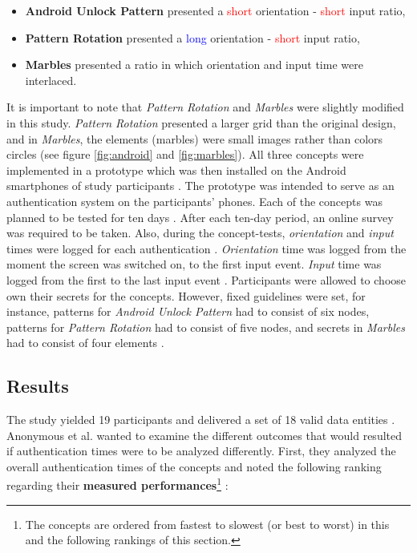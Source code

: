 \begin{itemize}
    \item \textbf{Android Unlock Pattern} presented a \textcolor{red}{short} orientation - \textcolor{red}{short} input ratio,
    \item \textbf{Pattern Rotation} presented a \textcolor{blue}{long} orientation - \textcolor{red}{short} input ratio,
    \item \textbf{Marbles} presented a ratio in which orientation and input time were interlaced.
\end{itemize}

It is important to note that \textit{Pattern Rotation} and \textit{Marbles} \cite{Marbles} were slightly modified in this study. \textit{Pattern Rotation} presented a larger grid than the original design, and in \textit{Marbles}, the elements (marbles) were small images rather than colors circles (see figure \ref{fig:android} and \ref{fig:marbles}). All three concepts were implemented in a prototype which was then installed on the Android smartphones of study participants \cite{anonymous}. The prototype was intended to serve as an authentication system on the participants' phones. Each of the concepts was planned to be tested for ten days \cite{anonymous}. After each ten-day period, an online survey was required to be taken. Also, during the concept-tests, \textit{orientation} and \textit{input} times were logged for each authentication \cite{anonymous}. \textit{Orientation} time was logged from the moment the screen was switched on, to the first input event. \textit{Input} time was logged from the first to the last input event \cite{anonymous}. Participants were allowed to choose own their secrets for the concepts. However, fixed guidelines were set, for instance, patterns for \textit{Android Unlock Pattern} had to consist of six nodes, patterns for \textit{Pattern Rotation} had to consist of five nodes, and secrets in \textit{Marbles} had to consist of four elements \cite{anonymous}.

\subsection{Results}

The study yielded 19 participants and delivered a set of 18 valid data entities \cite{anonymous}. Anonymous et al. \cite{anonymous} wanted to examine the different outcomes that would resulted if authentication times were to be analyzed differently. First, they analyzed the overall authentication times of the concepts and noted the following ranking regarding their \textbf{measured performances}\footnote{The concepts are ordered from fastest to slowest (or best to worst) in this and the following rankings of this section.} \cite{anonymous}:

